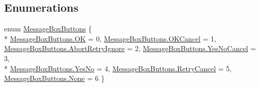 \subsection*{Enumerations}
\begin{DoxyCompactItemize}
\item 
enum \hyperlink{namespacegearit_1_1src_1_1_g_u_i_a142175becd6241f1b8c959354f0df291}{Message\+Box\+Buttons} \{ \\*
\hyperlink{namespacegearit_1_1src_1_1_g_u_i_a142175becd6241f1b8c959354f0df291ae0aa021e21dddbd6d8cecec71e9cf564}{Message\+Box\+Buttons.\+O\+K} = 0, 
\hyperlink{namespacegearit_1_1src_1_1_g_u_i_a142175becd6241f1b8c959354f0df291a2042306d74c38471b436df683af1a8b7}{Message\+Box\+Buttons.\+O\+K\+Cancel} = 1, 
\hyperlink{namespacegearit_1_1src_1_1_g_u_i_a142175becd6241f1b8c959354f0df291a080cccc8400ed0226bf270eadb078851}{Message\+Box\+Buttons.\+Abort\+Retry\+Ignore} = 2, 
\hyperlink{namespacegearit_1_1src_1_1_g_u_i_a142175becd6241f1b8c959354f0df291a71fc7b7aece69111c0b6967de4b101c5}{Message\+Box\+Buttons.\+Yes\+No\+Cancel} = 3, 
\\*
\hyperlink{namespacegearit_1_1src_1_1_g_u_i_a142175becd6241f1b8c959354f0df291ab65ffbcb4dcfb93ecdc257d6e4ba42c4}{Message\+Box\+Buttons.\+Yes\+No} = 4, 
\hyperlink{namespacegearit_1_1src_1_1_g_u_i_a142175becd6241f1b8c959354f0df291a5d1f937d009d6f924b50b9e742ecc8ac}{Message\+Box\+Buttons.\+Retry\+Cancel} = 5, 
\hyperlink{namespacegearit_1_1src_1_1_g_u_i_a142175becd6241f1b8c959354f0df291a6adf97f83acf6453d4a6a4b1070f3754}{Message\+Box\+Buttons.\+None} = 6
 \}
\end{DoxyCompactItemize}


